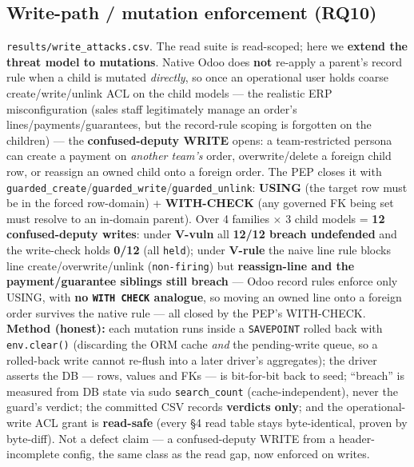 \documentclass[11pt,a4paper]{article}
\newcommand{\code}[1]{\texttt{#1}}
\begin{document}
\subsection{Write-path / mutation enforcement (RQ10)}
\code{results/write_attacks.csv}. The read suite is read-scoped; here we \textbf{extend the threat model to
mutations}. Native Odoo does \textbf{not} re-apply a parent's record rule when a child is mutated \emph{directly},
so once an operational user holds coarse create/write/unlink ACL on the child models --- the realistic ERP
misconfiguration (sales staff legitimately manage an order's lines/payments/guarantees, but the record-rule
scoping is forgotten on the children) --- the \textbf{confused-deputy WRITE} opens: a team-restricted persona can
create a payment on \emph{another team's} order, overwrite/delete a foreign child row, or reassign an owned child
onto a foreign order. The PEP closes it with \code{guarded\_create}/\code{guarded\_write}/\code{guarded\_unlink}:
\textbf{USING} (the target row must be in the forced row-domain) + \textbf{WITH-CHECK} (any governed FK being set
must resolve to an in-domain parent). Over 4 families $\times$ 3 child models = \textbf{12 confused-deputy writes}:
under \textbf{V-vuln} all \textbf{12/12 breach undefended} and the write-check holds \textbf{0/12} (all
\code{held}); under \textbf{V-rule} the naive line rule blocks line create/overwrite/unlink (\code{non-firing})
but \textbf{reassign-line and the payment/guarantee siblings still breach} --- Odoo record rules enforce only
USING, with \textbf{no \code{WITH CHECK} analogue}, so moving an owned line onto a foreign order survives the
native rule --- all closed by the PEP's WITH-CHECK. \textbf{Method (honest):} each mutation runs inside a
\code{SAVEPOINT} rolled back with \code{env.clear()} (discarding the ORM cache \emph{and} the pending-write queue,
so a rolled-back write cannot re-flush into a later driver's aggregates); the driver asserts the DB --- rows,
values and FKs --- is bit-for-bit back to seed; ``breach'' is measured from DB state via sudo \code{search\_count}
(cache-independent), never the guard's verdict; the committed CSV records \textbf{verdicts only}; and the
operational-write ACL grant is \textbf{read-safe} (every \S4 read table stays byte-identical, proven by byte-diff).
Not a defect claim --- a confused-deputy WRITE from a header-incomplete config, the same class as the read gap,
now enforced on writes.
\end{document}
